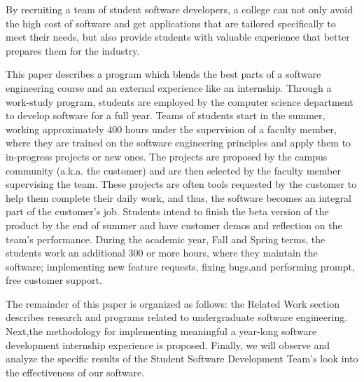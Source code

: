 By recruiting a team of student software developers, a college can not only avoid the high cost of software and get applications that are tailored specifically to meet their needs, but also provide students with valuable experience that better prepares them for the industry. 

This paper describes a program which blends the best parts of a software engineering course and an external experience like an internship. Through a work-study program, students are employed by the computer science department to develop software for a full year. Teams of students start in the summer, working approximately 400 hours under the supervision of a faculty member, where they are trained on the software engineering principles and apply them to in-progress projects or new ones. The projects are proposed by the campus community (a.k.a. the customer) and are then selected by the faculty member supervising the team. These projects are often tools requested by the customer to help them complete their daily work, and thus, the software becomes an integral part of the customer's job. Students intend to finish the beta version of the product by the end of summer and have customer demos and reflection on the team's performance. During the academic year, Fall and Spring terms, the students work an additional 300 or more hours, where they maintain the software; implementing new feature requests, fixing bugs,and performing prompt, free customer support. 

The remainder of this paper is organized as follows: the Related Work section describes research and programs related to undergraduate software engineering. Next,the methodology for implementing meaningful a year-long software development internship experience is proposed. Finally, we will observe and analyze the specific results of the Student Software Development Team's look into the effectiveness of our software.
